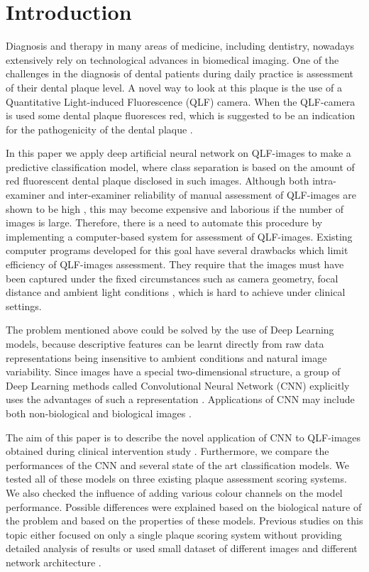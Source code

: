 \documentclass[runningheads,a4paper]{llncs}
\begin{document}
\section{Introduction}
Diagnosis and therapy in many areas of medicine, including dentistry, nowadays extensively rely on technological advances in biomedical imaging. One of the challenges in the diagnosis of dental patients during daily practice is assessment of their dental plaque level. A novel way to look at this plaque is the use of a Quantitative Light-induced Fluorescence (QLF) camera. When the QLF-camera is used some dental plaque fluoresces red, which is suggested to be an indication for the pathogenicity of the dental plaque \cite{van2016dynamics}.

In this paper we apply deep artificial neural network on QLF-images to make a predictive classification model, where class separation is based on the amount of red fluorescent dental plaque disclosed in such images. Although both intra-examiner and inter-examiner reliability of manual assessment of QLF-images are shown to be high \cite{volgenant2016comparison}, this may become expensive and laborious if the number of images is large. Therefore, there is a need to automate this procedure by implementing a computer-based system for assessment of QLF-images. Existing computer programs developed for this goal have several drawbacks which limit efficiency of QLF-images assessment. They require that the images must have been captured under the fixed circumstances such as camera geometry, focal distance and ambient light conditions \cite{kim2014monitoring}, which is hard to achieve under clinical settings.

The problem mentioned above could be solved by the use of Deep Learning models, because descriptive features can be learnt directly from raw data representations \cite{LeCun2015} being insensitive to ambient conditions and natural image variability. Since images have a special two-dimensional structure, a group of Deep Learning methods called Convolutional Neural Network (CNN) explicitly uses the advantages of such a representation \cite{jarrett2009best,lecun2010convolutional}. Applications of CNN may include both non-biological \cite{david2016deeppainter} and biological images \cite{esteva2017dermatologist}.

The aim of this paper is to describe the novel application of CNN to QLF-images obtained during clinical intervention study \cite{van2016dynamics}. Furthermore, we compare the performances of the CNN and several state of the art classification models. We tested all of these models on three existing plaque assessment scoring systems. We also checked the influence of adding various colour channels on the model performance. Possible differences were explained based on the biological nature of the problem and based on the properties of these models. Previous studies on this topic either focused on only a single plaque scoring system without providing detailed analysis of results \cite{imangaliyev2016deep} or used small dataset of different images and different network architecture \cite{kang2006dental}.
\end{document}
